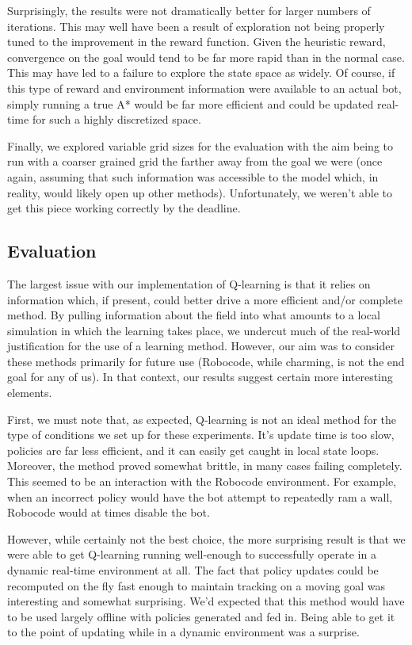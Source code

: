 \documentclass{aiaa-tc}%
\begin{document}
Surprisingly, the results were not dramatically better for larger
numbers of iterations. This may well have been a result of exploration
not being properly tuned to the improvement in the reward
function. Given the heuristic reward, convergence on the goal would
tend to be far more rapid than in the normal case. This may have led to a failure to explore
the state space as widely. Of course, if this type
of reward and environment information were available to an actual bot,
simply
running a true A* would be far more
efficient and could be updated real-time for such a highly discretized
space.

Finally, we explored variable grid sizes for the evaluation with the
aim being to run with a coarser grained grid the farther away from the
goal we were (once again, assuming that such information was
accessible to the model which, in reality, would likely open up other
methods). Unfortunately, we weren't able to get this piece working
correctly by the deadline.

\subsection{Evaluation}

The largest issue with our implementation of Q-learning is that it
relies on information which, if present, could better drive a more
efficient and/or complete method. By pulling information about the
field into what amounts to a local simulation in which the learning
takes place, we undercut much of the real-world justification for the
use of a learning method. However, our aim was to consider these
methods primarily for future use (Robocode, while charming, is not the
end goal for any of us). In that context, our results suggest certain
more interesting elements.

First, we must note that, as expected, Q-learning is not an ideal method for the type of
conditions we set up for these experiments. It's update time is too
slow, policies are far less efficient, and it can easily get caught in
local state loops. Moreover, the method proved somewhat brittle, in
many cases failing completely. This seemed to be an interaction with
the Robocode environment. For example, when an incorrect policy would
have the bot attempt to repeatedly ram a wall, Robocode would at times
disable the bot.

However, while certainly not the best choice, the more surprising
result is that we were able to get Q-learning running well-enough to
successfully operate in a dynamic real-time environment at all. The
fact that policy updates could be recomputed on the fly fast enough to
maintain tracking on a moving goal was interesting and somewhat
surprising. We'd expected that this method would have to be used
largely offline with policies generated and fed in. Being able to get
it to the point of updating while in a dynamic environment was a surprise.
\end{document}
